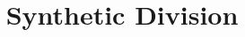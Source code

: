 \documentclass[12pt, a4paper, addpoints]{exam}
\title{Synthetic Division}
\date{}
\begin{document}

\maketitle
\vspace{-28mm}

\large

\begin{questions}










\end{questions}
\end{document}
